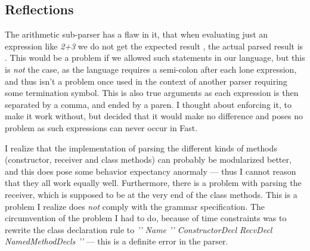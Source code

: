 %
%

\subsection{Reflections}
The arithmetic sub-parser has a flaw in it, that when evaluating just an
expression like {\it 2+3} we do not get the expected result , the actual parsed result is . This
would be a problem if we allowed such statements in our language, but this is
{\it not} the case, as the language requires a semi-colon after each lone
expression, and thus isn't a problem once used in the context of another
parser requiring some termination symbol. This is also true arguments as each
expression is then separated by a comma, and ended by a paren. I thought about
enforcing it, to make it work without, but decided that it would make no
difference and poses no problem as such expressions can never occur in Fast.

I realize that the implementation of parsing the different kinds of methods
(constructor, receiver and class methods) can probably be modularized better,
and this does pose some behavior expectancy anormaly --- thus I cannot reason
that they all work equally well. Furthermore, there is a problem with parsing
the receiver, which is supposed to be at the very end of the class methods.
This is a problem I realize does {\it not} comply with the grammar
specification. The circumvention of the problem I had to do, because of time
constraints was to rewrite the class declaration rule to {\it ''
Name '{' ConstructorDecl RecvDecl NamedMethodDecls '}'} --- this is a definite
error in the parser.
